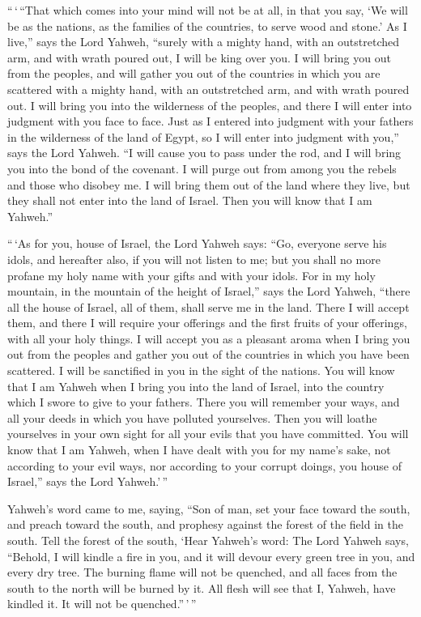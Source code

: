  ``\,`\,``That which comes into your mind will not be at
all, in that you say, `We will be as the nations, as the families of the
countries, to serve wood and stone.'  As I live,'' says
the Lord Yahweh, ``surely with a mighty hand, with an outstretched arm,
and with wrath poured out, I will be king over you.  I
will bring you out from the peoples, and will gather you out of the
countries in which you are scattered with a mighty hand, with an
outstretched arm, and with wrath poured out.  I will
bring you into the wilderness of the peoples, and there I will enter
into judgment with you face to face.  Just as I entered
into judgment with your fathers in the wilderness of the land of Egypt,
so I will enter into judgment with you,'' says the Lord Yahweh.
 ``I will cause you to pass under the rod, and I will
bring you into the bond of the covenant.  I will purge
out from among you the rebels and those who disobey me. I will bring
them out of the land where they live, but they shall not enter into the
land of Israel. Then you will know that I am Yahweh.''

 ``\,`As for you, house of Israel, the Lord Yahweh says:
``Go, everyone serve his idols, and hereafter also, if you will not
listen to me; but you shall no more profane my holy name with your gifts
and with your idols.  For in my holy mountain, in the
mountain of the height of Israel,'' says the Lord Yahweh, ``there all
the house of Israel, all of them, shall serve me in the land. There I
will accept them, and there I will require your offerings and the first
fruits of your offerings, with all your holy things.  I
will accept you as a pleasant aroma when I bring you out from the
peoples and gather you out of the countries in which you have been
scattered. I will be sanctified in you in the sight of the nations.
 You will know that I am Yahweh when I bring you into the
land of Israel, into the country which I swore to give to your fathers.
 There you will remember your ways, and all your deeds in
which you have polluted yourselves. Then you will loathe yourselves in
your own sight for all your evils that you have committed.
 You will know that I am Yahweh, when I have dealt with
you for my name's sake, not according to your evil ways, nor according
to your corrupt doings, you house of Israel,'' says the Lord
Yahweh.'\,''

 Yahweh's word came to me, saying,  ``Son
of man, set your face toward the south, and preach toward the south, and
prophesy against the forest of the field in the south. 
Tell the forest of the south, `Hear Yahweh's word: The Lord Yahweh says,
``Behold, I will kindle a fire in you, and it will devour every green
tree in you, and every dry tree. The burning flame will not be quenched,
and all faces from the south to the north will be burned by it.
 All flesh will see that I, Yahweh, have kindled it. It
will not be quenched.''\,'\,''

